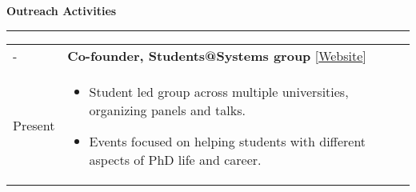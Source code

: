 \documentclass{article}
\newlength{\workexitemsep}
\newlength{\durlen}
\newlength{\deslen}
\newcommand{\sectiontitle}[1]{
  \textbf{\Large{\sffamily #1}}
  \begin{flushright}
      \vspace{-0.48cm} 
      \rule{0.975\textwidth}{1.1pt}
  \end{flushright}
  \vspace{-0.1cm} 
}
\begin{document}
\begin{enumerate}

\end{enumerate}

\ifdefined\resume
    \vspace{-0.2cm} 
\fi 

\newpage
\sectiontitle{Outreach Activities}

\begin{tabular}{p{\durlen} p{\deslen}}
  \centering 2022 -       & \textbf{Co-founder, Students@Systems group} [\href{https://students-at-systems.org}{Website}]  \hfill \textit{} \\
  \centering Present      & \vspace{-0.6cm}\begin{itemize}[itemsep=\workexitemsep]
          \item Student led group across multiple universities, organizing panels and talks.
          \item Events focused on helping students with different aspects of PhD life and career.
      
  \end{itemize}
\end{tabular}
\end{document}
